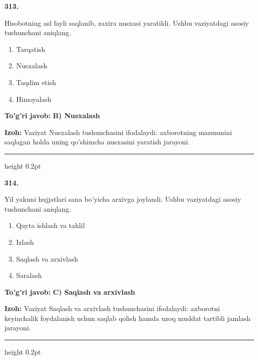 \documentclass[10pt,a4paper,oneside]{article}
\begin{document}
\noindent\textbf{\color{ink}313.}
\par
Hisobotning asl fayli saqlanib, zaxira nusxasi yaratildi. Ushbu vaziyatdagi asosiy tushunchani aniqlang.
\begin{enumerate}[label=\Alph*),leftmargin=9mm]
\item Tarqatish
\item Nusxalash
\item Taqdim etish
\item Himoyalash
\end{enumerate}
\begin{tcolorbox}[enhanced,breakable,colback=teal!4,colframe=teal!50!black,boxrule=0.5pt,arc=1.1mm,left=3mm,right=3mm,top=1.7mm,bottom=1.7mm,before skip=2mm,after skip=2mm]
\textbf{\color{teal}To'g'ri javob:} \textbf{B) Nusxalash}
\par\smallskip
\textbf{Izoh:} Vaziyat Nusxalash tushunchasini ifodalaydi: axborotning mazmunini saqlagan holda uning qo'shimcha nusxasini yaratish jarayoni.
\end{tcolorbox}
\vspace{2mm}\hrule height 0.2pt \vspace{3mm}

\noindent\textbf{\color{ink}314.}
\par
Yil yakuni hujjatlari sana bo'yicha arxivga joylandi. Ushbu vaziyatdagi asosiy tushunchani aniqlang.
\begin{enumerate}[label=\Alph*),leftmargin=9mm]
\item Qayta ishlash va tahlil
\item Izlash
\item Saqlash va arxivlash
\item Saralash
\end{enumerate}
\begin{tcolorbox}[enhanced,breakable,colback=teal!4,colframe=teal!50!black,boxrule=0.5pt,arc=1.1mm,left=3mm,right=3mm,top=1.7mm,bottom=1.7mm,before skip=2mm,after skip=2mm]
\textbf{\color{teal}To'g'ri javob:} \textbf{C) Saqlash va arxivlash}
\par\smallskip
\textbf{Izoh:} Vaziyat Saqlash va arxivlash tushunchasini ifodalaydi: axborotni keyinchalik foydalanish uchun saqlab qolish hamda uzoq muddat tartibli jamlash jarayoni.
\end{tcolorbox}
\vspace{2mm}\hrule height 0.2pt \vspace{3mm}
\end{document}
